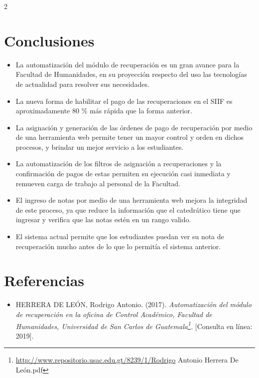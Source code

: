 \documentclass[11pt,spanish,Letterpaper,openany]{book}
\providecommand{\tightlist}{%
  \setlength{\itemsep}{0pt}\setlength{\parskip}{0pt}}
\let\rmarkdownfootnote\footnote%
\def\footnote{\protect\rmarkdownfootnote}
\begin{document}
\begin {multicols}{2}

\hypertarget{conclusiones-3}{%
\section{Conclusiones}\label{conclusiones-3}}

\begin{itemize}
\item
  La automatización del módulo de recuperación es un gran avance para la Facultad de Humanidades, en su proyección respecto del uso las tecnologías de actualidad para resolver sus necesidades.
\item
  La nueva forma de habilitar el pago de las recuperaciones en el SIIF es aproximadamente 80 \% más rápida que la forma anterior.
\item
  La asignación y generación de las órdenes de pago de recuperación por medio de una herramienta web permite tener un mayor control y orden en dichos procesos, y brindar un mejor servicio a los estudiantes.
\item
  La automatización de los filtros de asignación a recuperaciones y la confirmación de pagos de estas permiten su ejecución casi inmediata y remueven carga de trabajo al personal de la Facultad.
\item
  El ingreso de notas por medio de una herramienta web mejora la integridad de este proceso, ya que reduce la información que el catedrático tiene que ingresar y verifica que las notas estén en un rango valido.
\item
  El sistema actual permite que los estudiantes puedan ver su nota de recuperación mucho antes de lo que lo permitía el sistema anterior.
\end{itemize}

\hypertarget{referencias-3}{%
\section{Referencias}\label{referencias-3}}

\begin{itemize}
\tightlist
\item
  HERRERA DE LEÓN, Rodrigo Antonio. (2017). \emph{Automatización del módulo de recuperación en la oficina de Control Académico, Facultad de Humanidades, Universidad de San Carlos de Guatemala\footnote{\url{http://www.repositorio.usac.edu.gt/8239/1/Rodrigo} Antonio Herrera De León.pdf}.} {[}Consulta en línea: 2019{]}.
\end{itemize}

\end {multicols}
\end{document}
